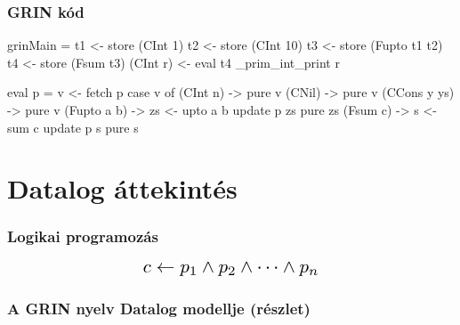 \documentclass[bigger]{beamer}
\begin{document}
\begin{frame}[fragile]
\frametitle{GRIN kód}

\begin{minipage}{0.4\textwidth}
	
	\begin{haskellcode}
		grinMain = 
		  t1 <- store (CInt 1)
		  t2 <- store (CInt 10)
		  t3 <- store (Fupto t1 t2)
		  t4 <- store (Fsum t3)
		  (CInt r) <- eval t4
		  _prim_int_print r
	\end{haskellcode}
\end{minipage}
\hfill
\begin{minipage}{0.48\textwidth}
	\vspace{1cm}
	\begin{haskellcode}
		eval p = 
		  v <- fetch p
		  case v of
		    (CInt n)     -> pure v
		    (CNil)       -> pure v
		    (CCons y ys) -> pure v
		    (Fupto a b) -> 
		      zs <- upto a b
		      update p zs
		      pure zs
		    (Fsum c) -> 
		      s <- sum c
		      update p s
		      pure s
	\end{haskellcode}
\end{minipage}


\end{frame}

\section{Datalog \'attekint\'es}

\begin{frame}
\frametitle{Logikai programozás}

  \begin{align*}
  	\scalebox{1.5}{$c \leftarrow p_1 \land p_2 \land \dots \land p_n$}
  \end{align*}

\end{frame}

\begin{frame}
\frametitle{A GRIN nyelv Datalog modellje (részlet)}
\end{frame}
\end{document}
